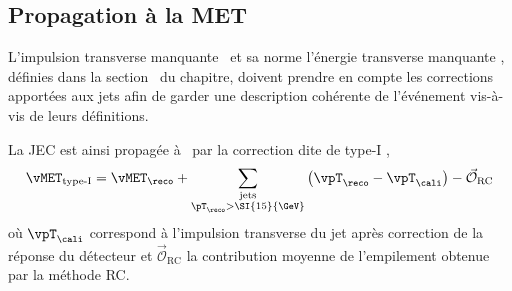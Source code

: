 \subsection{Propagation à la MET}\label{chapter-JERC-section-CMS-subsec-MET}
L'impulsion transverse manquante \vMET\ et sa norme l'énergie transverse manquante \MET,
définies dans la section~ du chapitre,
doivent prendre en compte les corrections apportées aux jets afin de garder une description cohérente de l'événement vis-à-vis de leurs définitions.
\par La JEC est ainsi propagée à \vMET\ par la correction dite de \og type-I \fg,
\begin{equation}
\vMET_\text{type-I} = \vMET_\reco + \sum_{\substack{\text{jets}\\\pT_\reco>\SI{15}{\GeV}}} \left(\vpT_\reco - \vpT_\cali\right) - \vec{\mathcal{O}}_\text{RC}
\end{equation}
où $\vpT_\cali$ correspond à l'impulsion transverse du jet après correction de la réponse du détecteur
et
$\vec{\mathcal{O}}_\text{RC}$ la contribution moyenne de l'empilement obtenue par la méthode RC.
